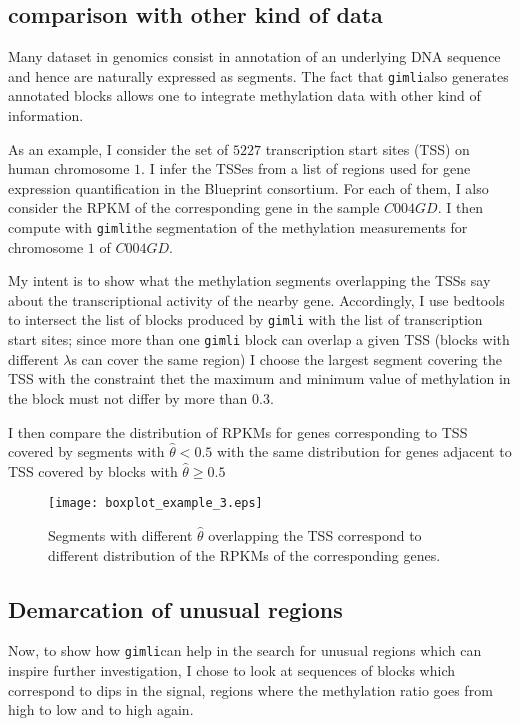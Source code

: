 \documentclass[11pt]{amsart}
\newcommand{\gimli}{\texttt{gimli}}
\begin{document}
\subsection{comparison with other kind of data}

Many dataset in genomics consist in annotation of an underlying
DNA sequence and hence are naturally expressed as segments. The
fact that \gimli also generates annotated blocks allows one to
integrate methylation data with other kind of information.

As an example, I consider the set of $5227$ transcription start sites
(TSS) on human chromosome $1$. I infer the TSSes from a list of 
regions used for gene expression quantification in the Blueprint 
consortium. For each of them, I also consider the RPKM of the corresponding
gene in the sample $C004GD$. I then compute with \gimli the segmentation
of the methylation measurements for chromosome $1$ of $C004GD$.

My intent is to show what the methylation segments overlapping the TSSs
say about the transcriptional activity of the nearby gene. Accordingly,
I use bedtools to intersect the list of blocks produced by \gimli
with the list of transcription start sites; since more than one \gimli
block can overlap a given TSS (blocks with different $\lambda$s can 
cover the same region) I choose the largest segment covering the TSS
with the constraint thet the maximum and minimum value of methylation
in the block must not differ by more than $0.3$.

I then compare the distribution of RPKMs for genes corresponding
to TSS covered by segments with $\hat{\theta}<0.5$ with the same distribution
for genes adjacent to TSS covered by blocks with $\hat{\theta} \geq 0.5$

\begin{figure}\label{ex3}
\texttt{[image: boxplot\_example\_3.eps]}
\caption{Segments with different $\hat{\theta}$ overlapping the TSS correspond
to different distribution of the RPKMs of the corresponding genes.}
\end{figure}





\subsection{Demarcation of unusual regions} 

Now, to show how \gimli can help in the search for unusual regions which
can inspire further investigation, I chose to look at sequences of blocks 
which correspond to dips in the signal, regions where the methylation
ratio goes from high to low and to high again.
\end{document}

